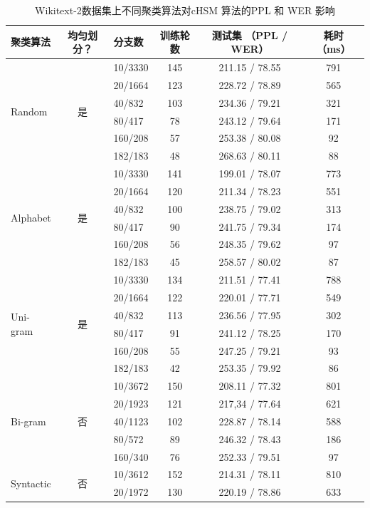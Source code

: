\begin{table}[!t]
\small
  \centering
  \caption{Wikitext-2数据集上不同聚类算法对cHSM 算法的PPL 和 WER 影响\label{table:clustering}}
  \begin{tabular}{lclccc} \toprule
聚类算法 & 均匀划分？&分支数& 训练轮数& 测试集 （PPL / WER）&耗时 （ms）\\ \midrule
  \multirow{6}{*}{Random}  &\multirow{6}{*}{是}&10/3330&145&211.15 / 78.55 &791\\
    &&20/1664&123&228.72 / 78.89&565\\
    &&40/832&103&234.36 / 79.21&321\\
    &&80/417&78&243.12 / 79.64&171\\
    &&160/208 &57&253.38 / 80.08&92\\
    &&182/183&48&268.63 / 80.11&88\\
  \midrule
  \multirow{6}{*}{Alphabet}  &\multirow{6}{*}{是}&10/3330 &141&199.01 / 78.07 &773\\
    &&20/1664 &120&211.34 / 78.23&551\\
    &&40/832 &100&238.75 / 79.02&313\\
    &&80/417 &90&241.75 / 79.34&174\\
    &&160/208 &56&248.35 / 79.62&97\\
    &&182/183&45&258.57 / 80.02&87\\
  \midrule
  \multirow{6}{*}{Uni-gram}   &\multirow{6}{*}{是} &10/3330&134&211.51 / 77.41 &788\\
    & &20/1664&122&220.01 / 77.71&549\\
    & &40/832&113&236.56 / 77.95&302\\
    & &80/417&91& 241.12 / 78.25&170\\
    & &160/208&55&247.25 / 79.21&93\\
    & &182/183&42&253.35 / 79.92&86\\
  \midrule
  \multirow{5}{*}{Bi-gram}   &\multirow{5}{*}{否}&10/3672&150&208.11 / 77.32&801\\
     &&20/1923&121&217,34 / 77.64&621\\
     &&40/1123&102&228.87 / 78.14&588\\
     &&80/572&89&246.32 / 78.43&186\\
     &&160/340&76&252.33 / 79.51&97\\
  \midrule
  \multirow{5}{*}{Syntactic}  &\multirow{5}{*}{否}&10/3612 &152&214.31 / 78.11&810\\
    &&20/1972 &130&220.19 / 78.86&633\\

\end{tabular}
\end{table}
